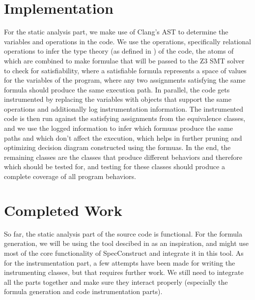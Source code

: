 \documentclass[12pt]{article}
\begin{document}
\section{Implementation}
For the static analysis part, we make use of Clang's AST to determine the variables and operations in the code. We use the operations, specifically relational operations to infer the type theory (as defined in \cite{specConstruct}) of the code, the atoms of which are combined to make formulae that will be passed to the Z3 SMT solver to check for satisfiability, where a satisfiable formula represents a space of values for the variables of the program, where any two assignments satisfying the same formula should produce the same execution path. In parallel, the code gets instrumented by replacing the variables with objects that support the same operations and additionally log instrumentation information. The instrumented code is then run against the satisfying assignments from the equivalence classes, and we use the logged information to infer which formuas produce the same paths and which don't affect the execution, which helps in further pruning and optimizing decision diagram constructed using the formuas. In the end, the remaining classes are the classes that produce different behaviors and therefore which should be tested for, and testing for these classes should produce a complete coverage of all program behaviors.

\section{Completed Work}
So far, the static analysis part of the source code is functional. For the formula generation, we will be using the tool descibed in \cite{specConstruct} as an inspiration, and might use most of the core functionality of SpecConstruct and integrate it in this tool. As for the instrumentation part, a few attempts have been made for writing the instrumenting classes, but that requires further work. We still need to integrate all the parts together and make sure they interact properly (especially the formula generation and code instrumentation parts).


\end{document}
